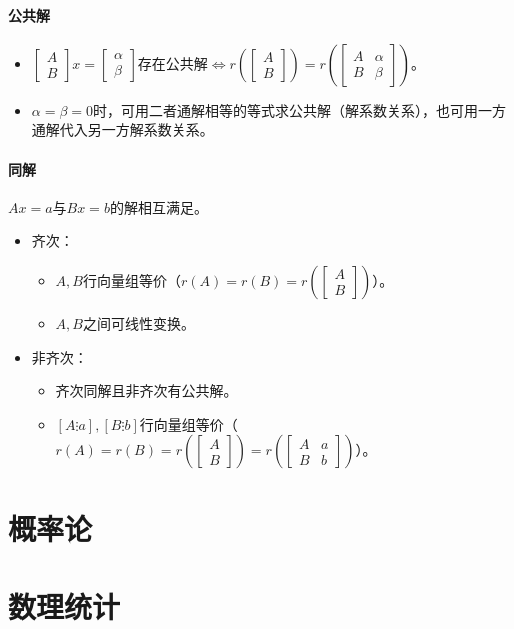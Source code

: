 \documentclass[
12pt, %
a4paper, 
oneside, %
headinclude,footinclude, %
]{scrartcl}
\begin{document}
\paragraph{公共解}
\begin{itemize}
\item $ \begin{bmatrix} A \\ B \end{bmatrix} x = \begin{bmatrix} \alpha \\ \beta \end{bmatrix} $存在公共解$ \Leftrightarrow $$ r(\begin{bmatrix} A \\ B \end{bmatrix}) = r(\begin{bmatrix} A & \alpha \\ B & \beta \end{bmatrix}) $。
\item $ \alpha = \beta = 0 $时，可用二者通解相等的等式求公共解（解系数关系），也可用一方通解代入另一方解系数关系。
\end{itemize}
\paragraph{同解}
$ Ax = a $与$ Bx = b $的解相互满足。
\begin{itemize}
\item 齐次：
\begin{itemize}
\item $ A,B $行向量组等价（$ r(A) = r(B) = r(\begin{bmatrix} A \\ B \end{bmatrix}) $）。
\item $ A,B $之间可线性变换。
\end{itemize}
\item 非齐次：
\begin{itemize}
\item 齐次同解且非齐次有公共解。
\item $ [A \vdots a],[B \vdots b] $行向量组等价（$ r(A) = r(B) = r(\begin{bmatrix} A \\ B \end{bmatrix}) = r(\begin{bmatrix} A & a \\ B & b \end{bmatrix}) $）。
\end{itemize}
\end{itemize}
\section{概率论}
\section{数理统计}
\end{document}
